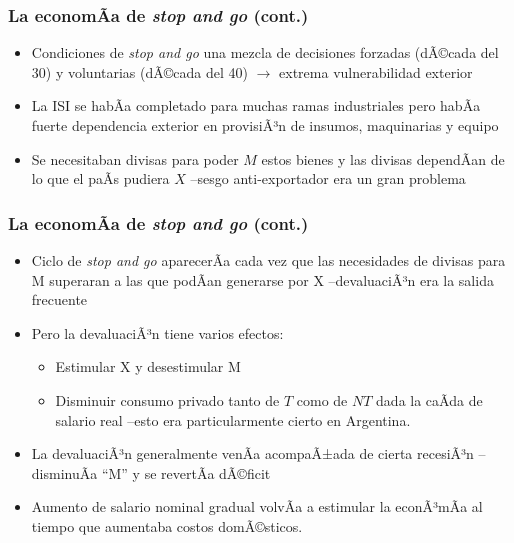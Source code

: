 \documentclass[14pt,aspectratio=169]{beamer}
\begin{document}
 \begin{frame}\frametitle{La economÃ­a de \textit{stop and go} (cont.)}
                 \begin{itemize}\itemsep 5pt \medskip
                 \item Condiciones de \textit{stop and go} una mezcla
                   de decisiones forzadas (dÃ©cada del 30) y voluntarias
                   (dÃ©cada del 40) $\longrightarrow$ extrema
                   vulnerabilidad exterior
                   \item La ISI se habÃ­a completado para muchas ramas
                     industriales pero habÃ­a fuerte dependencia
                     exterior en provisiÃ³n de insumos,
                     maquinarias y equipo
                     \item Se necesitaban divisas para poder $M$ estos
                       bienes y las divisas dependÃ­an de lo que el
                       paÃ­s pudiera $X$ --sesgo anti-exportador era un
                       gran problema
                   \end{itemize}
               \end{frame}

  \begin{frame}\frametitle{La economÃ­a de \textit{stop and go} (cont.)}
                 \begin{itemize}\itemsep 5pt \medskip
                 \item Ciclo de \textit{stop and go} aparecerÃ­a
                   cada vez que las necesidades de
                   divisas para M superaran a las que podÃ­an generarse
                   por X --devaluaciÃ³n era la salida frecuente
                 \item Pero la devaluaciÃ³n tiene varios efectos:
                   \begin{itemize}\itemsep 5pt \medskip
                   \item Estimular X y desestimular M
                     \item Disminuir consumo privado tanto de $T$ como
                       de $NT$ dada la caÃ­da de
                       salario real --esto era particularmente
                       cierto en Argentina. 
                     \end{itemize}
                     \item La devaluaciÃ³n
                       generalmente venÃ­a acompaÃ±ada de cierta
                       recesiÃ³n --disminuÃ­a ``M'' y se revertÃ­a
                       dÃ©ficit
                       \item Aumento de salario nominal gradual volvÃ­a
                         a estimular la econÃ³mÃ­a al tiempo que
                         aumentaba costos domÃ©sticos. 
                   \end{itemize}
               \end{frame}
\end{document}
